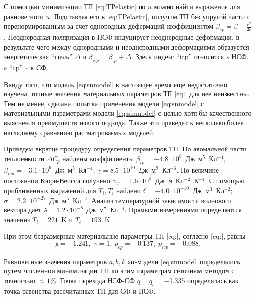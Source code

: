С помощью минимизации ТП \eqref{eq:TPelastic} по $u$ можно найти выражение для равновесного $u$. 
Подставляя его в \eqref{eq:TPelastic}, получим ТП без упругой части с перенормированным за счет однородных деформаций коэффициентом $\beta_{cp} = \beta - \frac{r^2}{2c}$. 
Неоднородная поляризация в НСФ индуцирует неоднородные деформации, в результате чего между однородными и неоднородными деформациями образуется энергетическая ``щель'' $\Delta$ \cite{Vysochanskii1994} и $\beta_{icp} = \beta_{cp} + \Delta$. 
Здесь индекс ``icp'' относится к НСФ, а ``cp'' -- к СФ.

Ввиду того, что модель \eqref{eq:snmodel} в настоящее время еще недостаточно изучена, точные значения материальных параметров ТП \eqref{eq:} для нее неизвестны. 
Тем не менее, сделана попытка применения модели \eqref{eq:snmodel} с материальными параметрами модели \eqref{eq:sinmodel} с целью хотя бы качественного выяснения преимуществ нового подхода. 
Также это приведет к  несколько более наглядному сравнению рассматриваемых моделей.

Приведем вкратце процедуру определения параметров ТП. По аномальной части теплоемкости $\Delta C_p$ найдены коэффициенты $\beta_{cp} = -4.8\cdot10^8$~Дж~м$^5$~Кл$^{-4}$, $\beta_{icp} = -3.1\cdot10^9$~Дж~м$^5$~Кл$^{-4}$, $\gamma = 8.5\cdot10^{10}$~Дж~м$^9$~Кл$^{-6}$. По величине постоянной Кюри-Вейсса получено $\alpha_T = 1.6\cdot10^6$~Дж~м~Кл$^{-2}$~К$^{-1}$. С помощью приближенных выражений для $T_i, T_c$ найдено $\delta = -4.0\cdot10^{-10}$~Дж~м$^3$~Кл$^{-2}$; $\sigma = 2.2\cdot10^{-27}$~Дж~м$^5$~Кл$^{-2}$. Анализ температурной зависимости волнового вектора дает $\lambda = 1.2\cdot10^{-8}$~Дж~м$^7$~Кл$^{-4}$. Прямыми измерениями определяются значения $T_i=221$~K и $T_c=193$~K.

При этом безразмерные материальные параметры ТП \eqref{eq:}, согласно \eqref{eq:}, равны 
\begin{equation}\label{eq:initparams}
g = -1.241, \; \gamma = 1, \; p_{cp} = -0.137, \; p_{icp} = -0.088.
\end{equation}

Равновесные значения параметров $a,b,k$ $\operatorname{sn}$-модели \eqref{eq:snmodel} определялись путем численной минимизации ТП по этим параметрам сеточным методом с точностью $\approx 1\%$. Точка перехода НСФ-СФ $q = q_c = -0.335$ определялась как точка равенства рассчитанных ТП для СФ и НСФ.

